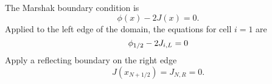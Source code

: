 The Marshak boundary condition is 
	\begin{equation}
		\phi(x) - 2J(x) = 0. 
	\end{equation}
Applied to the left edge of the domain, the equations for cell $i=1$ are 
	\begin{equation}
		\phi_{1/2} - 2J_{i,L} = 0
	\end{equation}
Apply a reflecting boundary on the right edge 
	\begin{equation}
		J(x_{N+1/2}) = J_{N,R} = 0. 
	\end{equation}

